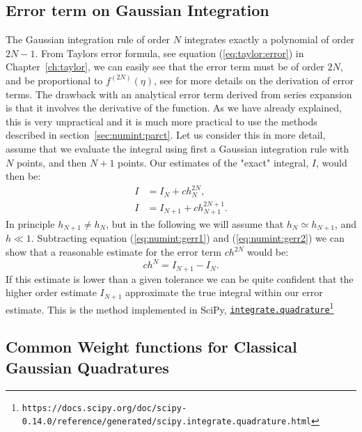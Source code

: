 \documentclass[graybox,sectrefs,envcountresetchap,open=right,final]{svmonodo}
\begin{document}
\subsection{Error term on Gaussian Integration}
The Gaussian integration rule of order $N$ integrates exactly a polynomial of order $2N-1$. 
From Taylors error formula, see equation (\ref{eq:taylor:error}) in Chapter~\ref{ch:taylor},
we can easily see that the error term must be of order $2N$, and be proportional to $f^{(2N)}(\eta)$, see \cite{stoer2013} for more details on the derivation of error terms. The drawback with an analytical error term derived from series expansion is that it involves the derivative of the function. As we have already explained, this is very unpractical and it is much more practical to use the methods described in section~\ref{sec:numint:parct}. Let us consider this in more detail, assume that we evaluate the integral using first a Gaussian integration rule with $N$ points, and then $N+1$ points. Our estimates of the "exact" integral, $I$,  would then be:
\begin{align}
 I&=I_N+ch_{N}^{2N},\label{eq:numint:gerr1}\\ 
 I&=I_{N+1}+ch_{N+1}^{2N+1}.
\label{eq:numint:gerr2}
\end{align}
In principle $h_{N+1}\neq h_{N}$, but in the following we will assume that $h_N\simeq h_{N+1}$, and $h\ll 1$. Subtracting equation (\ref{eq:numint:gerr1}) and (\ref{eq:numint:gerr2}) we can show that a reasonable estimate for the error term $ch^{2N}$ would be:
\begin{equation}
ch^N= I_{N+1}-I_N.
\end{equation}
If this estimate is lower than a given tolerance we can be quite confident that the higher order estimate $I_{N+1}$ approximate the true integral within our error estimate. This is the method implemented in SciPy, \href{{https://docs.scipy.org/doc/scipy-0.14.0/reference/generated/scipy.integrate.quadrature.html}}{\nolinkurl{integrate.quadrature}\footnote{\texttt{https://docs.scipy.org/doc/scipy-0.14.0/reference/generated/scipy.integrate.quadrature.html}}}
\subsection{Common Weight functions for Classical Gaussian Quadratures}
\end{document}
